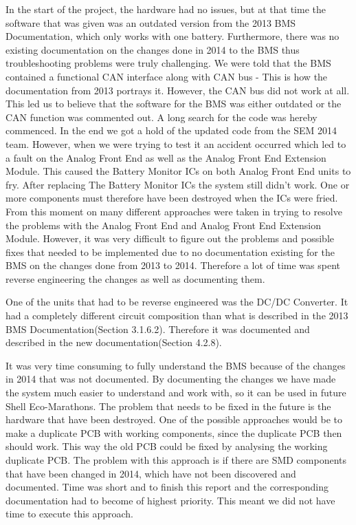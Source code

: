 In the start of the project, the hardware had no issues, but at that time the software that was given was an outdated version from the 2013 BMS Documentation\cite{BMSDocumentation}, which only works with one battery. Furthermore, there was no existing documentation on the changes done in 2014 to the BMS thus troubleshooting problems were truly challenging.
We were told that the BMS contained a functional CAN interface along with CAN bus - This is how the documentation from 2013 portrays it. However, the CAN bus did not work at all. This led us to believe that the software for the BMS was either outdated or the CAN function was commented out. A long search for the code was hereby commenced. In the end we got a hold of the updated code from the SEM 2014 team. However, when we were trying to test it an accident occurred which led to a fault on the Analog Front End as well as the Analog Front End Extension Module. This caused the Battery Monitor ICs on both Analog Front End units to fry.
After replacing The Battery Monitor ICs the system still didn't work. One or more components must therefore have been destroyed when the ICs were fried. From this moment on many different approaches were taken in trying to resolve the problems with the Analog Front End and Analog Front End Extension Module. However, it was very difficult to figure out the problems and possible fixes that needed to be implemented due to no documentation existing for the BMS on the changes done from 2013 to 2014. Therefore a lot of time was spent reverse engineering the changes as well as documenting them. 

One of the units that had to be reverse engineered was the DC/DC Converter. It had a completely different circuit composition than what is described in the 2013 BMS Documentation\cite{BMSDocumentation}(Section 3.1.6.2). Therefore it was documented and described in the new documentation\cite{AU2}(Section 4.2.8). 

It was very time consuming to fully understand the BMS because of the changes in 2014 that was not documented. By documenting the changes we have made the system much easier to understand and work with, so it can be used in future Shell Eco-Marathons. The problem that needs to be fixed in the future is the hardware that have been destroyed. One of the possible approaches would be to make a duplicate PCB with working components, since the duplicate PCB then should work. This way the old PCB could be fixed by analysing the working duplicate PCB. The problem with this approach is if there are SMD components that have been changed in 2014, which have not been discovered and documented. Time was short and to finish this report and the corresponding documentation had to become of highest priority. This meant we did not have time to execute this approach.